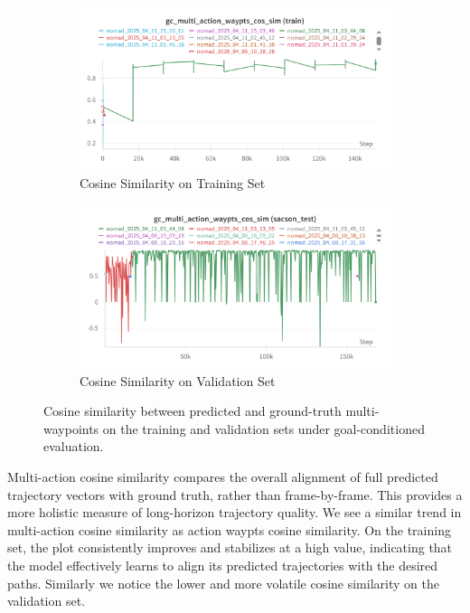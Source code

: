 \documentclass[12pt]{article}
\begin{document}
\begin{figure}[H]
    \centering
    \begin{subfigure}[b]{0.48\textwidth}
        \centering
        \includegraphics[width=\textwidth]{images/gc_multi_action_waypts_cos_sim.png}
        \caption{Cosine Similarity on Training Set}
        \label{fig:gc_multi_action_waypts_cos_sim}
    \end{subfigure}
    \hfill
    \begin{subfigure}[b]{0.48\textwidth}
        \centering
        \includegraphics[width=\textwidth]{images/gc_multi_action_waypts_cos_sim_test.png}
        \caption{Cosine Similarity on Validation Set}
        \label{fig:gc_action_multi_waypts_cos_sim_test}
    \end{subfigure}
    \caption{Cosine similarity between predicted and ground-truth multi-waypoints on the training and validation sets under goal-conditioned evaluation.}
\end{figure}
Multi-action cosine similarity compares the overall alignment of full predicted trajectory vectors with ground truth, rather than frame-by-frame. This provides a more holistic measure of long-horizon trajectory quality.
We see a similar trend in multi-action cosine similarity as action waypts cosine similarity. On the training set, the plot consistently improves and stabilizes at a high value, indicating that the model effectively learns to align its predicted trajectories with the desired paths. Similarly we notice the lower and more volatile cosine similarity on the validation set.
\newpage
\end{document}
